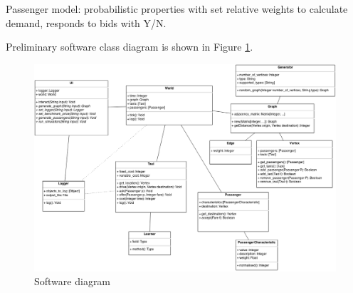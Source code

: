 Passenger model: probabilistic properties with set relative weights to
calculate demand, responds to bids with Y/N.

Preliminary software class diagram is shown in Figure
\ref{figure:design:software}. 

\begin{figure}
  \begin{center}
    \includegraphics[width=\textwidth]{../figures/software_diagram}
    \caption{
      Software diagram
      \label{figure:design:software}
    }
  \end{center}
\end{figure}
